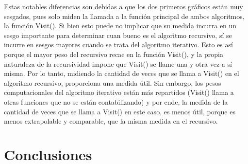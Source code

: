 \documentclass[12pt,a4paper]{article}
\begin{document}
Estas notables diferencias son debidas a que los dos primeros gráficos están muy sesgados, pues solo miden la llamada a la función principal de ambos algoritmos, la función Visit(). Si bien esto puede no implicar que su medida incurra en un sesgo importante para determinar cuan bueno es el algoritmo recursivo, sí se incurre en sesgos mayores cuando se trata del algoritmo iterativo. Esto es así porque el mayor peso del recursivo recae en la función Visit(), y la propia naturaleza de la recursividad impone que Visit() se llame una y otra vez a sí misma. Por lo tanto, midiendo la cantidad de veces que se llama a Visit() en el algoritmo recursivo, proporciona una medida útil. Sin embargo, los pesos computacionales del algoritmo iterativo están más repartidos (Visit() llama a otras funciones que no se están contabilizando) y por ende, la medida de la cantidad de veces que se llama a Visit() en este caso, es menos útil, porque es menos extrapolable y comparable, que la misma medida en el recursivo. 

\clearpage
\section{Conclusiones}

\clearpage


\end{document}
